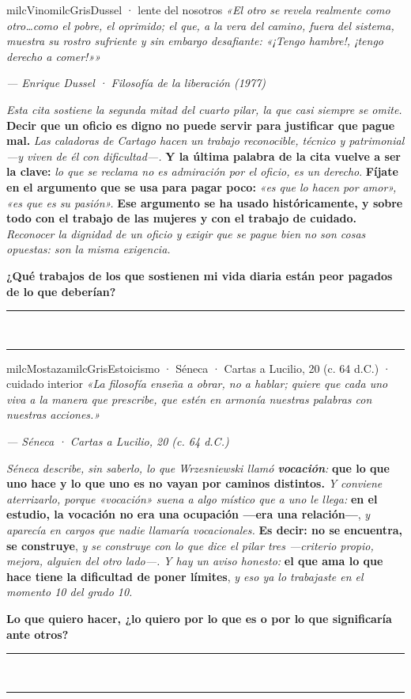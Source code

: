 \documentclass[11pt,letterpaper]{article}
\newcommand{\linead}[1]{\noindent\color{milcLinea}\rule{#1}{0.5pt}\color{milcNegro}}
\begin{document}
\begin{softbox}{milcVino}{milcGris}{Dussel · lente del nosotros}
\textit{«El otro se revela realmente como otro\ldots como el pobre, el oprimido; el que, a la vera del camino, fuera del sistema, muestra su rostro sufriente y sin embargo desafiante: «¡Tengo hambre!, ¡tengo derecho a comer!»»}

{\footnotesize\itshape\color{milcNegro!70}--- Enrique Dussel · Filosofía de la liberación (1977)}

\emph{Esta cita sostiene la segunda mitad del cuarto pilar, la que casi siempre se omite.} \textbf{Decir que un oficio es digno no puede servir para justificar que pague mal.} \emph{Las caladoras de Cartago hacen un trabajo reconocible, técnico y patrimonial ---y viven de él con dificultad---.} \textbf{Y la última palabra de la cita vuelve a ser la clave:} \emph{lo que se reclama no es admiración por el oficio, es un derecho}. \textbf{Fíjate en el argumento que se usa para pagar poco:} \emph{«es que lo hacen por amor», «es que es su pasión».} \textbf{Ese argumento se ha usado históricamente, y sobre todo con el trabajo de las mujeres y con el trabajo de cuidado.} \emph{Reconocer la dignidad de un oficio y exigir que se pague bien no son cosas opuestas: son la misma exigencia.}

\textbf{¿Qué trabajos de los que sostienen mi vida diaria están peor pagados de lo que deberían?}
\end{softbox}
\linead{\linewidth}\\[1mm]
\linead{\linewidth}

\begin{softbox}{milcMostaza}{milcGris}{Estoicismo · Séneca · Cartas a Lucilio, 20 (c. 64 d.C.) · cuidado interior}
\textit{«La filosofía enseña a obrar, no a hablar; quiere que cada uno viva a la manera que prescribe, que estén en armonía nuestras palabras con nuestras acciones.»}

{\footnotesize\itshape\color{milcNegro!70}--- Séneca · Cartas a Lucilio, 20 (c. 64 d.C.)}

\emph{Séneca describe, sin saberlo, lo que Wrzesniewski llamó \textbf{vocación}:} \textbf{que lo que uno hace y lo que uno es no vayan por caminos distintos.} \emph{Y conviene aterrizarlo, porque «vocación» suena a algo místico que a uno le llega:} \textbf{en el estudio, la vocación no era una ocupación ---era una relación---}, \emph{y aparecía en cargos que nadie llamaría vocacionales.} \textbf{Es decir: no se encuentra, se construye}, \emph{y se construye con lo que dice el pilar tres ---criterio propio, mejora, alguien del otro lado---.} \emph{Y hay un aviso honesto:} \textbf{el que ama lo que hace tiene la dificultad de poner límites}, \emph{y eso ya lo trabajaste en el momento 10 del grado 10.}

\textbf{Lo que quiero hacer, ¿lo quiero por lo que es o por lo que significaría ante otros?}
\end{softbox}
\linead{\linewidth}\\[1mm]
\linead{\linewidth}
\end{document}
